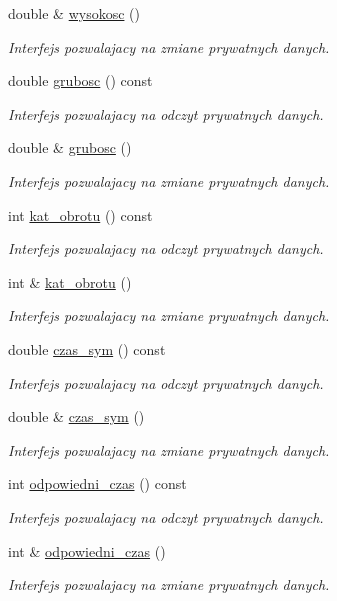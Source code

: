 \begin{DoxyCompactItemize}
double \& \hyperlink{class_zbiornik_af02cf0dac56cbb096a2e77e22f19afed}{wysokosc} ()
\begin{DoxyCompactList}\small\item\em Interfejs pozwalajacy na zmiane prywatnych danych. \end{DoxyCompactList}\item 
double \hyperlink{class_zbiornik_a34b0e660d8d6c4d1f45f06f5063b9788}{grubosc} () const 
\begin{DoxyCompactList}\small\item\em Interfejs pozwalajacy na odczyt prywatnych danych. \end{DoxyCompactList}\item 
double \& \hyperlink{class_zbiornik_a9a8f3d5b4fcc2ab626fb2a5602127810}{grubosc} ()
\begin{DoxyCompactList}\small\item\em Interfejs pozwalajacy na zmiane prywatnych danych. \end{DoxyCompactList}\item 
int \hyperlink{class_zbiornik_ab0a2ae2523139dadc52a9499a6c2ab98}{kat\+\_\+obrotu} () const 
\begin{DoxyCompactList}\small\item\em Interfejs pozwalajacy na odczyt prywatnych danych. \end{DoxyCompactList}\item 
int \& \hyperlink{class_zbiornik_a9f00e4eed1ba89fcf0307c80d7c2a961}{kat\+\_\+obrotu} ()
\begin{DoxyCompactList}\small\item\em Interfejs pozwalajacy na zmiane prywatnych danych. \end{DoxyCompactList}\item 
double \hyperlink{class_zbiornik_a94a4b32ae64aab4836be8c536358f612}{czas\+\_\+sym} () const 
\begin{DoxyCompactList}\small\item\em Interfejs pozwalajacy na odczyt prywatnych danych. \end{DoxyCompactList}\item 
double \& \hyperlink{class_zbiornik_abad8da28f2224b54c259c399bf68fc44}{czas\+\_\+sym} ()
\begin{DoxyCompactList}\small\item\em Interfejs pozwalajacy na zmiane prywatnych danych. \end{DoxyCompactList}\item 
int \hyperlink{class_zbiornik_ac0899810e0771b37ce815717d98190f7}{odpowiedni\+\_\+czas} () const 
\begin{DoxyCompactList}\small\item\em Interfejs pozwalajacy na odczyt prywatnych danych. \end{DoxyCompactList}\item 
int \& \hyperlink{class_zbiornik_afc80f37f2aaa84dd22dca5e4741f8495}{odpowiedni\+\_\+czas} ()
\begin{DoxyCompactList}\small\item\em Interfejs pozwalajacy na zmiane prywatnych danych. \end{DoxyCompactList}\end{DoxyCompactItemize}
